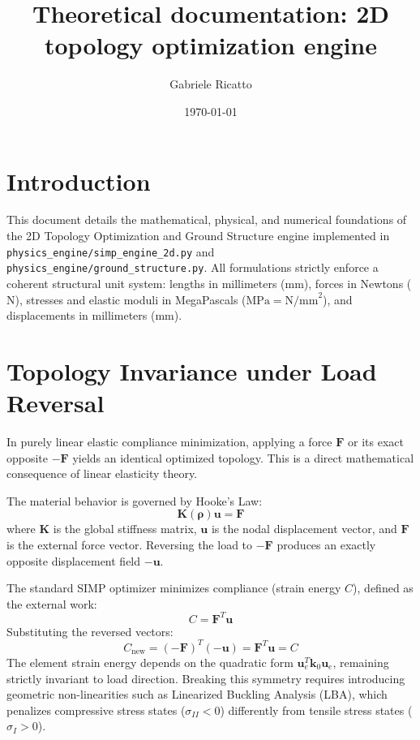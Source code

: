 \documentclass[11pt, a4paper]{article}
\title{Theoretical documentation: 2D topology optimization engine}
\author{Gabriele Ricatto}
\date{\today}
\begin{document}
\maketitle

\section{Introduction}
This document details the mathematical, physical, and numerical foundations of the 2D Topology Optimization and Ground Structure engine implemented in \texttt{physics\_engine/simp\_engine\_2d.py} and \texttt{physics\_engine/ground\_structure.py}. All formulations strictly enforce a coherent structural unit system: lengths in millimeters ($\text{mm}$), forces in Newtons ($\text{N}$), stresses and elastic moduli in MegaPascals ($\text{MPa} = \text{N/mm}^2$), and displacements in millimeters ($\text{mm}$).

\section{Topology Invariance under Load Reversal}
In purely linear elastic compliance minimization, applying a force $\mathbf{F}$ or its exact opposite $-\mathbf{F}$ yields an identical optimized topology. This is a direct mathematical consequence of linear elasticity theory.

The material behavior is governed by Hooke's Law:
\begin{equation}
    \mathbf{K}(\boldsymbol{\rho}) \mathbf{u} = \mathbf{F}
\end{equation}
where $\mathbf{K}$ is the global stiffness matrix, $\mathbf{u}$ is the nodal displacement vector, and $\mathbf{F}$ is the external force vector. Reversing the load to $-\mathbf{F}$ produces an exactly opposite displacement field $-\mathbf{u}$.

The standard SIMP optimizer minimizes compliance (strain energy $C$), defined as the external work:
\begin{equation}
    C = \mathbf{F}^T \mathbf{u}
\end{equation}
Substituting the reversed vectors:
\begin{equation}
    C_{\text{new}} = (-\mathbf{F})^T (-\mathbf{u}) = \mathbf{F}^T \mathbf{u} = C
\end{equation}
The element strain energy depends on the quadratic form $\mathbf{u}_e^T \mathbf{k}_0 \mathbf{u}_e$, remaining strictly invariant to load direction. Breaking this symmetry requires introducing geometric non-linearities such as Linearized Buckling Analysis (LBA), which penalizes compressive stress states ($\sigma_{II} < 0$) differently from tensile stress states ($\sigma_I > 0$).
\end{document}
